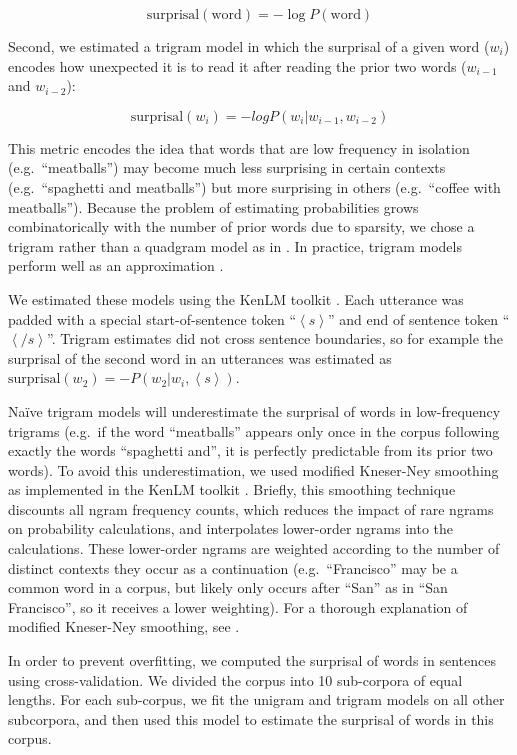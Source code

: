 \documentclass[entropy,article,submit,moreauthors,pdftex]{mdpi}
\begin{document}
\[\text{surprisal}(\text{word}) = -\log P(\text{word})\]

Second, we estimated a trigram model in which the surprisal of a given
word (\(w_i\)) encodes how unexpected it is to read it after reading the
prior two words (\(w_{i-1}\) and \(w_{i-2}\)):

\[\text{surprisal}(w_{i}) = -log P(w_i|w_{i-1},w_{i-2})\]

This metric encodes the idea that words that are low frequency in
isolation (e.g.~``meatballs'') may become much less surprising in
certain contexts (e.g.~``spaghetti and meatballs'') but more surprising
in others (e.g.~``coffee with meatballs''). Because the problem of
estimating probabilities grows combinatorically with the number of prior
words due to sparsity, we chose a trigram rather than a quadgram model
as in \citet{genzel2002}. In practice, trigram models perform well as an
approximation \citep[see e.g.][]{chen1999, smith2013}.

We estimated these models using the KenLM toolkit \citep{heafield2013}.
Each utterance was padded with a special start-of-sentence token
``\(\left<s\right>\)'' and end of sentence token
``\(\left</s\right>\)''. Trigram estimates did not cross sentence
boundaries, so for example the surprisal of the second word in an
utterances was estimated as
\(\text{surprisal}(w_{2}) = -P(w_2|w_{i},\left<s\right>)\).

Naïve trigram models will underestimate the surprisal of words in
low-frequency trigrams (e.g.~if the word ``meatballs'' appears only once
in the corpus following exactly the words ``spaghetti and'', it is
perfectly predictable from its prior two words). To avoid this
underestimation, we used modified Kneser-Ney smoothing as implemented in
the KenLM toolkit \citep{heafield2013}. Briefly, this smoothing
technique discounts all ngram frequency counts, which reduces the impact
of rare ngrams on probability calculations, and interpolates lower-order
ngrams into the calculations. These lower-order ngrams are weighted
according to the number of distinct contexts they occur as a
continuation (e.g.~``Francisco'' may be a common word in a corpus, but
likely only occurs after ``San'' as in ``San Francisco'', so it receives
a lower weighting). For a thorough explanation of modified Kneser-Ney
smoothing, see \citet{chen1999}.

In order to prevent overfitting, we computed the surprisal of words in
sentences using cross-validation. We divided the corpus into 10
sub-corpora of equal lengths. For each sub-corpus, we fit the unigram
and trigram models on all other subcorpora, and then used this model to
estimate the surprisal of words in this corpus.
\end{document}
